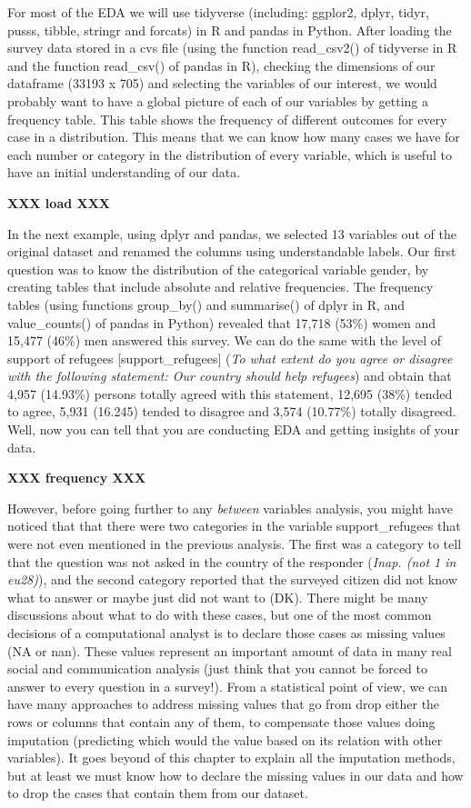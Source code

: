 For most of the EDA we will use tidyverse (including: ggplor2, dplyr, tidyr, pusss, tibble, stringr and forcats) in R and pandas in Python. After loading the survey data stored in a cvs file (using the function read\_csv2() of tidyverse in R and the function read\_csv() of pandas in R), checking the dimensions of our dataframe (33193 x 705) and selecting the variables of our interest, we would probably want to have a global picture of each of our variables by getting a frequency table. This table shows the frequency of different outcomes for every case in a distribution. This means that we can know how many cases we have for each number or category in the distribution of every variable, which is useful to have an initial understanding of our data.

\textbf{XXX  load  XXX}
		
		
In the next example, using dplyr and pandas, we selected 13 variables out of the original dataset and renamed the columns using understandable labels. Our first question was to know the distribution of the categorical variable gender, by creating tables that include absolute and relative frequencies. The frequency tables (using functions group\_by() and summarise() of dplyr in R, and value\_counts() of pandas in Python) revealed that 17,718 (53\%) women and 15,477 (46\%) men answered this survey. We can do the same with the level of support of refugees [support\_refugees] (\textit{To what extent do you agree or disagree with the following statement: Our country should help refugees}) and obtain that 4,957 (14.93\%) persons totally agreed with this statement, 12,695 (38\%) tended to agree, 5,931 (16.245) tended to disagree and 3,574 (10.77\%) totally disagreed. Well, now you can tell that you are conducting EDA and getting insights of your data.

\textbf{XXX  frequency  XXX}

However, before going further to any \textit{between} variables analysis, you might have noticed that that there were two categories in the variable support\_refugees that were not even mentioned in the previous analysis. The first was a category to tell that the question was not asked in the country of the responder (\textit{Inap. (not 1 in eu28)}), and the second category reported that the surveyed citizen did not know what to answer or maybe just did not want to (DK). There might be many discussions about what to do with these cases, but one of the most common decisions of a computational analyst is to declare those cases as missing values (NA or nan).  These values represent an important amount of data in many real social and communication analysis (just think that you cannot be forced to answer to every question in a survey!). From a statistical point of view, we can have many approaches to address missing values that go from drop either the rows or columns that contain any of them, to compensate those values doing imputation (predicting which would the value based on its relation with other variables). It goes beyond of this chapter to explain all the imputation methods, but at least we must know how to declare the missing values in our data and how to drop the cases that contain them from our dataset.

